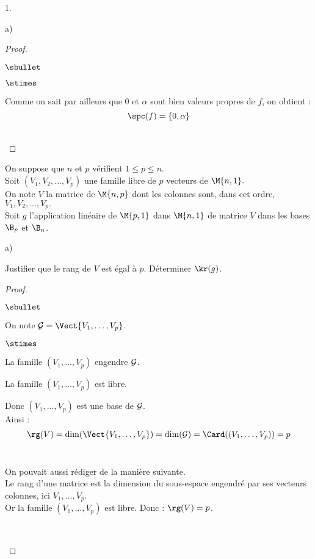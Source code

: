 \begin{noliste}{1.}
\begin{noliste}{a)}
\begin{proof}
\begin{remarkL}{0.95}
\begin{noliste}{$\sbullet$}
\begin{noliste}{$\stimes$}
      \item Comme on sait par ailleurs que $0$ et $\alpha$ sont 
      bien valeurs propres de $f$, on obtient :
      \[
        \spc(f) = \{0,\alpha\}
      \]
    \end{noliste}
    \end{noliste}
   \end{remarkL}~\\[-1.4cm]
  \end{proof}
 \end{noliste}
 
 
 
 
 \newpage
 
 
 
 
 \item On suppose que $n$ et $p$ vérifient $1 \leq p \leq n$.\\
 Soit $(V_1,V_2,...,V_p)$ une famille libre de $p$ vecteurs de 
 $\M{n,1}.$\\
 On note $V$ la matrice de $\M{n,p}$ dont les colonnes sont, dans cet 
 ordre, $V_1,V_2,...,V_p.$\\
 Soit $g$ l'application linéaire de $\M{p,1}$ dans $\M{n,1}$ de matrice 
 $V$ dans les bases $\B_p$ et $\B_n$.
 \begin{noliste}{a)}
  \setlength{\itemsep}{2mm}
  \item Justifier que le rang de $V$ est égal à $p$. Déterminer 
  $\kr(g)$.
  
  \begin{proof}~
   \begin{noliste}{$\sbullet$}
    \item On note ${\cal G} = \Vect{V_1, \ldots, V_p}$.
    \begin{noliste}{$\stimes$}
      \item La famille $(V_1, \ldots, V_p)$ engendre ${\cal G}$.
      \item La famille $(V_1, \ldots, V_p)$ est libre.
    \end{noliste} 
    
    Donc $(V_1, \ldots, V_p)$ est une base de ${\cal G}$.\\
    Ainsi : ~\\[-.6cm]
    \[
     \rg(V) = \dim(\Vect{V_1, \ldots , V_p}) = \dim({\cal G})
     = \Card((V_1, \ldots, V_p))= p
    \]
    ~\\[-1cm]
    
    \begin{remark}
      On pouvait aussi rédiger de la manière suivante.\\
      Le rang d'une matrice est la dimension du sous-espace
      engendré par ses vecteurs colonnes, ici $V_1, \ldots,
      V_p$.\\
      Or la famille $(V_1, \ldots, V_p)$ est libre. Donc :
      $\rg(V)=p$.
    \end{remark}~\\[-1.2cm]


\end{noliste}
\end{proof}
\end{noliste}
\end{noliste}
